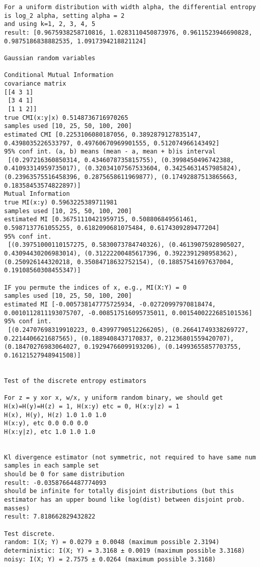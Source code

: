 \documentclass[10pt,a4paper]{article} %
\theoremstyle{definition}
\begin{document}
\begin{lstlisting}
For a uniform distribution with width alpha, the differential entropy is log_2 alpha, setting alpha = 2
and using k=1, 2, 3, 4, 5
result: [0.9675938258710816, 1.0283110450873976, 0.9611523946690828, 0.9875186838882535, 1.0917394218821124]

Gaussian random variables

Conditional Mutual Information
covariance matrix
[[4 3 1]
 [3 4 1]
 [1 1 2]]
true CMI(x:y|x) 0.5148736716970265
samples used [10, 25, 50, 100, 200]
estimated CMI [0.2253106080187056, 0.3892879127835147, 0.4398035226533797, 0.49760670969901555, 0.512074966143492]
95% conf int. (a, b) means (mean - a, mean + b)is interval
 [(0.297216360850314, 0.4346078735815755), (0.3998450496742388, 0.41093314959735017), (0.32034107567533604, 0.34254631457985824), (0.23963575516458396, 0.2875658611969877), (0.17492887513865663, 0.18358453574822897)]
Mutual Information
true MI(x:y) 0.5963225389711981
samples used [10, 25, 50, 100, 200]
estimated MI [0.36751110421959715, 0.508806849561461, 0.5987137761055255, 0.6182090681075484, 0.6174309289477204]
95% conf int.
 [(0.39751000110157275, 0.5830073784740326), (0.46139075928905027, 0.43094430206983014), (0.31222200485617396, 0.3922391298958362), (0.250926144320218, 0.35084718632752154), (0.18857541697637004, 0.19108560308455347)]

IF you permute the indices of x, e.g., MI(X:Y) = 0
samples used [10, 25, 50, 100, 200]
estimated MI [-0.005738147775725934, -0.02720997970818474, 0.0010112811193075707, -0.008517516095735011, 0.0015400222685101536]
95% conf int.
 [(0.24707698319910223, 0.43997790512266205), (0.26641749338269727, 0.2214406621687565), (0.1889408437170837, 0.21236801559420707), (0.18470276983064027, 0.19294766099193206), (0.14993655857703755, 0.16121527948941508)]


Test of the discrete entropy estimators

For z = y xor x, w/x, y uniform random binary, we should get H(x)=H(y)=H(z) = 1, H(x:y) etc = 0, H(x:y|z) = 1
H(x), H(y), H(z) 1.0 1.0 1.0
H(x:y), etc 0.0 0.0 0.0
H(x:y|z), etc 1.0 1.0 1.0


Kl divergence estimator (not symmetric, not required to have same num samples in each sample set
should be 0 for same distribution
result: -0.03587664487774093
should be infinite for totally disjoint distributions (but this estimator has an upper bound like log(dist) between disjoint prob. masses)
result: 7.818662829432822

Test discrete.
random: I(X; Y) = 0.0279 ± 0.0048 (maximum possible 2.3194)
deterministic: I(X; Y) = 3.3168 ± 0.0019 (maximum possible 3.3168)
noisy: I(X; Y) = 2.7575 ± 0.0264 (maximum possible 3.3168)
\end{lstlisting}
\end{document}
